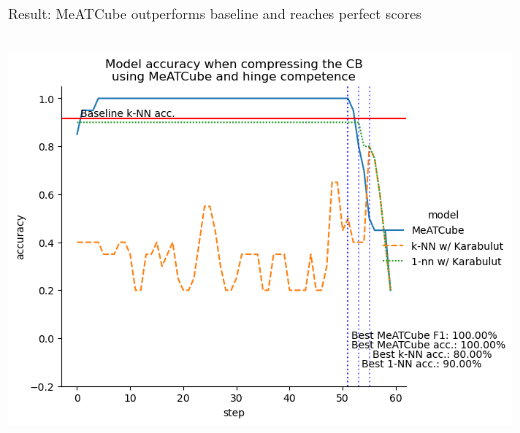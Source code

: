 \documentclass[]{beamer}
\begin{document}
\begin{frame}{Result: {\smaller MeATCube outperforms baseline and reaches perfect scores}}
\begin{columns}
\begin{column}{.65\textwidth}
            \includegraphics[width=.8\textwidth]{../results-weight-estim+/figs/zoo}
        \end{column}
    \end{columns}
\end{frame}
\end{document}
